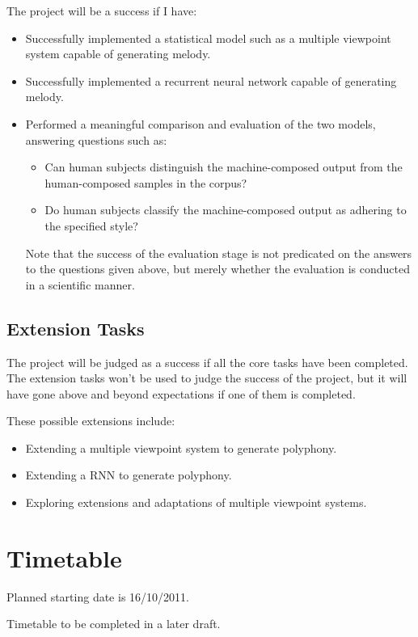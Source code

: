 \documentclass[12pt,a4paper,twoside]{article}
\begin{document}
The project will be a success if I have:
\begin{itemize}
	\item Successfully implemented a statistical model such as a multiple
		viewpoint system capable of generating melody.
	\item Successfully implemented a recurrent neural network capable of
		generating melody.
	\item Performed a meaningful comparison and evaluation of the two
		models, answering questions such as:
	\begin{itemize}
		\item Can human subjects distinguish the machine-composed output
			from the human-composed samples in the corpus?
		\item Do human subjects classify the machine-composed output as
			adhering to the specified style?
	\end{itemize}

	Note that the success of the evaluation stage is not predicated on the
	answers to the questions given above, but merely whether the evaluation
	is conducted in a scientific manner.
\end{itemize}

\subsection*{Extension Tasks}

The project will be judged as a success if all the core tasks have been
completed. The extension tasks won't be used to judge the success of the
project, but it will have gone above and beyond expectations if one of them is
completed.

These possible extensions include:
\begin{itemize}
	\item Extending a multiple viewpoint system to generate polyphony.
	\item Extending a RNN to generate polyphony.
	\item Exploring extensions and adaptations of multiple viewpoint
		systems.
\end{itemize}

\section*{Timetable}

Planned starting date is 16/10/2011.

Timetable to be completed in a later draft.
\end{document}
